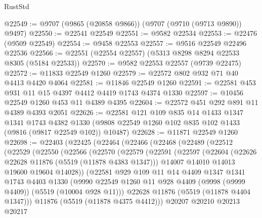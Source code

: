 \begin{lexlean}{RustStd}
\begin{coremodule}
@22549 := @9707 (@9865 (@20858 @9866)) (@9707 (@9710 (@9713 @9890)) @9497)
@22550 := @22541 @22549
@22551 := @9582 @22534
@22553 := @22476 (@9509 @22549)
@22554 := @9458 @22553
@22557 := @9516 @22549 @22496 @22536
@22566 := @22551 (@22554 @22557) (@5313 @8298 @8294 @22533 @8305 (@5184 @22533))
@22570 := @9582 @22553 @22557 (@9739 @22475)
@22572 := @11833 @22549 @1260
@22579 := @22572 @802 @932 @71 @40 @4413 @4420 @4064
@22581 := @11846 @22549 @1260
@22591 := @22581 @453 @931 @11 @15 @4397 @4412 @4419 @1743 @4374 @1330
@22597 := @10456 @22549 @1260 @453 @11 @4389 @4395
@22604 := @22572 @451 @292 @891 @11 @4389 @4393 @2051
@22626 := @22581
    @121
    @109
    @835
    @14
    @1433
    @1347
    @1341
    @1743
    @4382
    @1330
    (@9808 @22549 @1260 @102 @835 @102 @1433 (@9816 (@9817 @22549 @102)) @10487)
@22628 := @11871 @22549 @1260
@22698 := @22403
    (@22425
      (@22464
        (@22466
          (@22468
            (@22489
              (@22512
                (@22529
                  (@22550
                    (@22566
                      (@22570
                        (@22579
                          (@22591
                            (@22597
                              (@22604
                                (@22626 @22628 @11876 (@5519 (@11878 @4383 @1347)))
                                @14007
                                @14010
                                @14013
                                @19600
                                @19604
                                @14028))
                            (@22581
                              @929
                              @109
                              @11
                              @14
                              @4409
                              @1347
                              @1341
                              @1743
                              @4403
                              @1330
                              (@9990
                                @22549
                                @1260
                                @11
                                @928
                                @4409
                                (@9998 (@9999 @4409))
                                (@5519 (@10004 @928 @11)))
                              @22628
                              @11876
                              (@5519 (@11878 @4404 @1347)))
                            @11876
                            (@5519 (@11878 @4375 @4412)))
                          @20207
                          @20210
                          @20213
                          @20217

\end{coremodule}
\end{lexlean}
